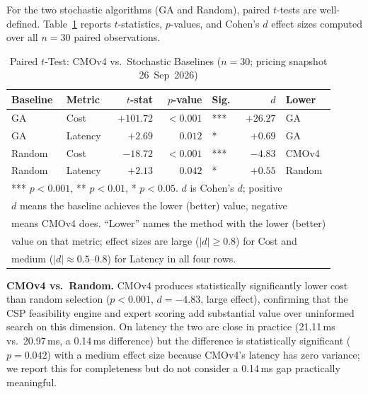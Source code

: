 \documentclass[journal]{IEEEtran}
\newcommand{\cmofour}{CMOv4\xspace}
\begin{document}
For the two stochastic algorithms (GA and Random), paired $t$-tests are
well-defined. Table~\ref{tab:stats} reports $t$-statistics, $p$-values, and
Cohen's $d$ effect sizes computed over all $n = 30$ paired observations.

\begin{table}[t]
\centering
\caption{Paired $t$-Test: CMOv4 vs.\ Stochastic Baselines ($n = 30$; pricing snapshot 26~Sep~2026)}
\label{tab:stats}
\scriptsize
\setlength{\tabcolsep}{2pt}
\begin{tabular}{@{}llrrlrl@{}}
\toprule
Baseline & Metric  & $t$-stat & $p$-value & Sig. & $d$ & Lower \\
\midrule
GA       & Cost    & $+101.72$ & $<0.001$  & *** & $+26.27$    & GA     \\
GA       & Latency & $+2.69$   & $0.012$   & *   & $+0.69$     & GA     \\
Random   & Cost    & $-18.72$  & $<0.001$  & *** & $-4.83$     & CMOv4  \\
Random   & Latency & $+2.13$   & $0.042$   & *   & $+0.55$     & Random \\
\bottomrule
\multicolumn{7}{l}{\footnotesize{*** $p<0.001$, ** $p<0.01$, * $p<0.05$. $d$ is Cohen's $d$; positive}}\\
\multicolumn{7}{l}{\footnotesize{$d$ means the baseline achieves the lower (better) value, negative}}\\
\multicolumn{7}{l}{\footnotesize{means CMOv4 does. ``Lower'' names the method with the lower (better)}}\\
\multicolumn{7}{l}{\footnotesize{value on that metric; effect sizes are large ($|d|\geq0.8$) for Cost and}}\\
\multicolumn{7}{l}{\footnotesize{medium ($|d|\approx0.5$--$0.8$) for Latency in all four rows.}}\\
\end{tabular}
\end{table}

\textbf{CMOv4 vs.\ Random.}
\cmofour produces statistically significantly lower cost than random
selection ($p<0.001$, $d=-4.83$, large effect), confirming that the CSP
feasibility engine and expert scoring add substantial value over uninformed
search on this dimension. On latency the two are close in practice
(21.11\,ms vs.\ 20.97\,ms, a 0.14\,ms difference) but the difference is
statistically significant ($p=0.042$) with a medium effect size because
\cmofour's latency has zero variance; we report this for completeness but do
not consider a 0.14\,ms gap practically meaningful.
\end{document}
